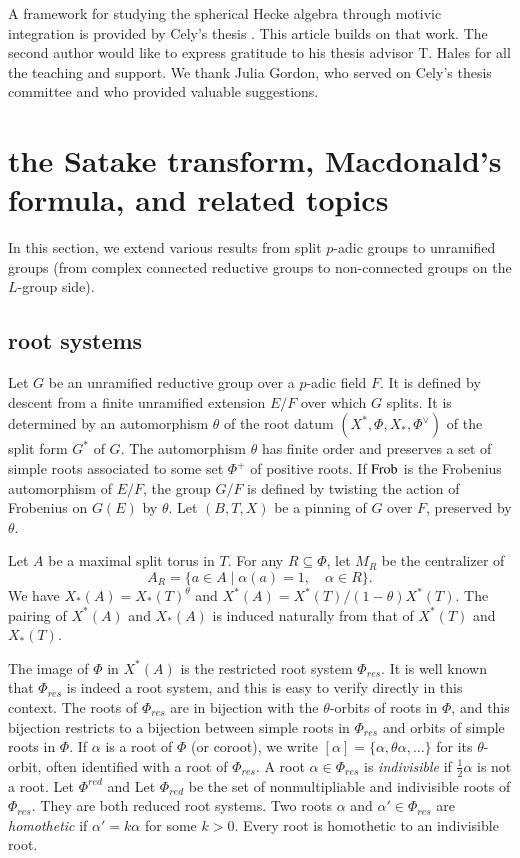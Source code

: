 A framework for studying the spherical Hecke algebra through motivic
integration is provided by Cely's thesis \cite{cely}.  This article
builds on that work.  The second author would like to
express gratitude to his thesis advisor T. Hales for all the
teaching and support.  We thank Julia Gordon, who served on Cely's
thesis committee and who provided valuable suggestions.



\section{the Satake transform, 
Macdonald's formula, and related topics}

In this section, we extend various results from split $p$-adic groups
to unramified groups (from complex connected reductive groups to
non-connected groups on the $L$-group side).

\subsection{root systems}

Let $G$ be an unramified reductive group over a $p$-adic field $F$.
It is defined by descent from a finite unramified extension $E/F$ over
which $G$ splits.  It is determined by an automorphism $\theta$ of the
root datum $(X^*,\Phi,X_*,\Phi^\vee)$ of the split form $G^*$ of $G$.
The automorphism $\theta$ has finite order and preserves a set of
simple roots associated to some set $\Phi^+$ of positive roots.  If
${\operatorname{Frob}}$ is the Frobenius automorphism of $E/F$, the group $G/F$ is
defined by twisting the action of Frobenius on $G(E)$ by $\theta$.  Let
$(B,T,X)$ be a pinning of $G$ over $F$, preserved by $\theta$.

Let $A$ be a maximal split torus in $T$.  For any $R\subseteq \Phi$,
let $M_R$ be the centralizer of
\[
A_R = \{a\in A\mid \alpha(a)=1,\quad \alpha\in R\}.
\]
We have $X_*(A) = X_*(T)^\theta$ and $X^*(A) =
X^*(T)/(1-\theta)X^*(T)$.  The pairing of $X^*(A)$ and $X_*(A)$ is
induced naturally from that of $X^*(T)$ and $X_*(T)$.

The image of $\Phi$ in $X^*(A)$ is the restricted root system $\Phi_{res}$.
It is well known that $\Phi_{res}$ is indeed a root system, and this is
easy to verify directly in this context.  The roots of $\Phi_{res}$ are in
bijection with the $\theta$-orbits of roots in $\Phi$, and this
bijection restricts to a bijection between simple roots in $\Phi_{res}$
and orbits of simple roots in $\Phi$.  If $\alpha$ is a root of $\Phi$
(or coroot), we write $[\alpha]=\{\alpha,\theta\alpha,\ldots\}$ for
its $\theta$-orbit, often identified with a root of $\Phi_{res}$.
A root $\alpha\in\Phi_{res}$ is {\it indivisible} if $\frac12\alpha$ is not a root.
Let $\Phi^{red}$ and 
Let $\Phi_{red}$ be the set of nonmultipliable and
indivisible roots of $\Phi_{res}$.  %
They are both reduced root systems.
Two roots $\alpha$ and $\alpha'\in\Phi_{res}$ are {\it homothetic} if
$\alpha' = k\alpha$ for some $k>0$.  Every root is homothetic to an
indivisible root.  %

